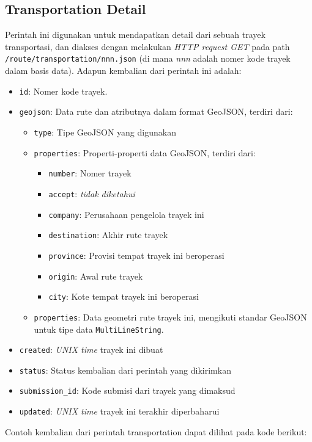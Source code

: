 \subsection{Transportation Detail}
Perintah ini digunakan untuk mendapatkan detail dari sebuah trayek transportasi, dan diakses dengan melakukan \textit{HTTP request GET} pada path \verb|/route/transportation/nnn.json| (di mana \textit{nnn} adalah nomer kode trayek dalam basis data). Adapun kembalian dari perintah ini adalah:

\begin{itemize}
	\item \verb/id/: Nomer kode trayek.
	\item \verb/geojson/: Data rute dan atributnya dalam format
		GeoJSON\cite{geojson}, terdiri dari:
		\begin{itemize}
			\item \verb/type/: Tipe GeoJSON yang digunakan
			\item \verb/properties/: Properti-properti data GeoJSON, terdiri dari:
				\begin{itemize}
					\item \verb/number/: Nomer trayek
					\item \verb/accept/: \textit{tidak diketahui}
					\item \verb/company/: Perusahaan pengelola trayek ini
					\item \verb/destination/: Akhir rute trayek
					\item \verb/province/: Provisi tempat trayek ini beroperasi
					\item \verb/origin/: Awal rute trayek
					\item \verb/city/: Kote tempat trayek ini beroperasi
				\end{itemize}
			\item \verb/properties/: Data geometri rute trayek ini, mengikuti standar GeoJSON untuk tipe data \verb/MultiLineString/.
		\end{itemize}
	\item \verb/created/: \textit{UNIX time} trayek ini dibuat
	\item \verb/status/: Status kembalian dari perintah yang dikirimkan
	\item \verb/submission_id/: Kode submisi dari trayek yang dimaksud
	\item \verb/updated/: \textit{UNIX time} trayek ini terakhir diperbaharui
\end{itemize}

Contoh kembalian dari perintah transportation dapat dilihat pada kode berikut:


